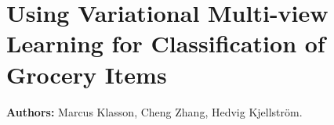 
\section{Using Variational Multi-view Learning for Classification of Grocery Items}
\label{sec:paperB}

\textbf{Authors:} Marcus Klasson, Cheng Zhang, Hedvig Kjellström. 